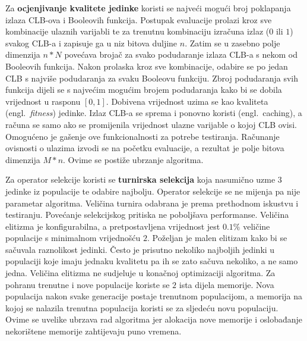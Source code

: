 \documentclass[times, utf8, diplomski]{fer}
\begin{document}
Za \textbf{ocjenjivanje kvalitete jedinke} koristi se najveći mogući broj poklapanja izlaza CLB-ova i Booleovih funkcija. Postupak evaluacije prolazi kroz sve kombinacije ulaznih varijabli te za trenutnu kombinaciju izračuna izlaz ($0$ ili $1$) svakog CLB-a i zapisuje ga u niz bitova duljine $n$. Zatim se u zasebno polje dimenzija $n*N$ povećava brojač za svako podudaranje izlaza CLB-a s nekom od Booleovih funkcija. Nakon prolaska kroz sve kombinacije, odabire se po jedan CLB s najviše podudaranja za svaku Booleovu funkciju. Zbroj podudaranja svih funkcija dijeli se s najvećim mogućim brojem podudaranja kako bi se dobila vrijednost u rasponu $[0, 1]$. Dobivena vrijednost uzima se kao kvaliteta (engl.~\textit{fitness}) jedinke. Izlaz CLB-a se sprema i ponovno koristi (engl.~caching), a računa se samo ako se promijenila vrijednost ulazne varijable o kojoj CLB ovisi. Omogućeno je gašenje ove funkcionalnosti za potrebe testiranja. Računanje ovisnosti o ulazima izvodi se na početku evaluacije, a rezultat je polje bitova dimenzija $M*n$. Ovime se postiže ubrzanje algoritma.

Za operator selekcije koristi se \textbf{turnirska selekcija} koja nasumično uzme $3$ jedinke iz populacije te odabire najbolju. Operator selekcije se ne mijenja pa nije parametar algoritma. Veličina turnira odabrana je prema prethodnom iskustvu i testiranju. Povećanje selekcijskog pritiska ne poboljšava performanse. Veličina elitizma je konfigurabilna, a pretpostavljena vrijednost jest $0.1\%$ veličine populacije s minimalnom vrijednošću $2$. Poželjan je malen elitizam kako bi se sačuvala raznolikost jedinki. Često je prisutno nekoliko najboljih jedinki u populaciji koje imaju jednaku kvalitetu pa ih se zato sačuva nekoliko, a ne samo jedna. Veličina elitizma ne sudjeluje u konačnoj optimizaciji algoritma. Za pohranu trenutne i nove populacije koriste se $2$ ista dijela memorije. Nova populacija nakon svake generacije postaje trenutnom populacijom, a memorija na kojoj se nalazila trenutna populacija koristi se za sljedeću novu populaciju. Ovime se uvelike ubrzava rad algoritma jer alokacija nove memorije i oslobađanje nekorištene memorije zahtijevaju puno vremena.
\end{document}
